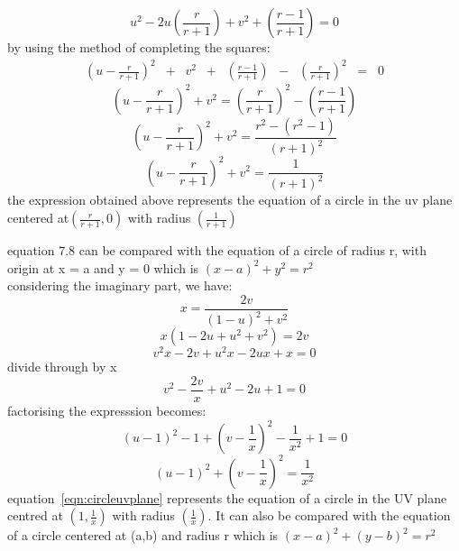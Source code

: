 \begin{equation}
u^2 - 2u(\frac{r}{r + 1}) + v^2 +(\frac{r - 1}{r + 1}) = 0
\end{equation}
by using the method of completing the squares:
\begin{align*}
(u - \frac{r}{r+1})^2\;\;+\;\;v^2\;\;+\;\;(\frac{r-1}{r+1})\;\; - \;\;(\frac{r}{r+1})^2\;\; = \;\;0
\end{align*}
\begin{equation*}
(u - \frac{r}{r + 1})^2 + v^2 =(\frac{r}{r + 1})^2 -(\frac{r - 1}{r + 1}) 
\end{equation*}
\begin{equation*}
(u - \frac{r}{r + 1})^2+ v^2 =\frac{r^2 -(r^2 -1)}{(r + 1)^2}
\end{equation*}
\begin{equation}
(u - \frac{r}{r + 1})^2+ v^2 = \frac{1}{(r + 1)^2}
\end{equation}
the expression obtained above represents the equation of a circle in the uv plane centered at$ (\frac{r}{r + 1}, 0) $ with radius $ (\frac{1}{r + 1}) $

equation 7.8 can be compared  with  the equation of a circle of radius r, with origin at x = a and y = 0 which is $ (x - a)^2 + y^2 = r^2 $\\ 
considering the imaginary part, we have:
\begin{equation*}
x =\frac{2v}{(1 - u)^2 + v^2}
\end{equation*}
\begin{equation*}
x(1 - 2u + u^2 + v^2) = 2v
\end{equation*}
\begin{equation*}
v^2x - 2v + u^2x - 2ux + x = 0
\end{equation*}
divide through by x
\begin{equation*}
v^2 - \frac{2v}{x} +u^2 - 2u + 1 = 0
\end{equation*}
factorising the expresssion becomes:
\begin{equation*}
(u - 1)^2 -1 + (v - \frac{1}{x})^2 -\frac{1}{x^2} + 1 = 0
\end{equation*}
\begin{equation}
(u - 1)^2 + (v - \frac{1}{x})^2 = \frac{1}{x^2}\label{eqn:circleuvplane}
\end{equation}
equation~\eqref{eqn:circleuvplane} represents the equation of a circle in the UV plane centred at $ (1,\frac{1}{x}) $ with radius $ (\frac{1}{x}) $.
It can also be compared with the equation of a circle centered at (a,b) and radius r which is $ (x - a)^2 + (y-b)^2 = r^2 $

